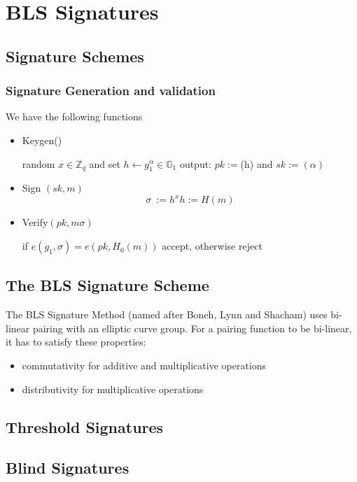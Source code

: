 \documentclass[a4paper,12pt]{scrartcl}
\begin{document}
\pagebreak

\section{BLS Signatures}
\subsection{Signature Schemes}
\subsubsection{Signature Generation and validation}
We have the following functions
\begin{itemize}
	\item Keygen()
	\begin{center}
		random \( x\in \mathbb{Z}_{q} \) and set \( h \leftarrow g_{1}^\alpha\in \mathbb{G}_{1} \) output: \( pk := \)(h) and \( sk := (\alpha) \)
	\end{center}
	\item Sign \( (sk, m) \)
	\[ \sigma\ := h^x  h := H(m) \]
	\item Verify\( (pk, m \sigma) \)
	\begin{center}
		if \( e(g_{1},\sigma) = e(pk, H_{0}(m)) \) accept, otherwise reject
	\end{center}
\end{itemize}
\subsection{The BLS Signature Scheme}
The BLS Signature Method (named after Boneh, Lynn and Shacham) uses bi-linear pairing with an elliptic curve group.
\newline
For a pairing function to be bi-linear, it has to satisfy these properties:
\begin{itemize}
	\item commutativity for additive and multiplicative operations
	\item distributivity for multiplicative operations
\end{itemize}

\subsection{Threshold Signatures}

\subsection{Blind Signatures}
\end{document}
